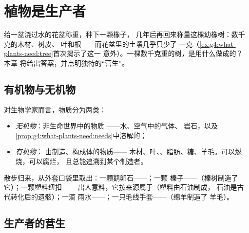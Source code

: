 \chapter{植物是生产者}\label{ch:g6:plants-are-producers}

给一盆浇过水的花盆称重，种下一颗橡子，
几年后再回来称量这棵幼橡树：数千克的木材、树皮、
叶和根——而花盆里的土壤几乎只少了
一克（\cref{ex:g4:what-plants-need:tree}首次揭示了这一
意外）。一棵数千克重的树，是用什么做成的？本章
将给出答案，并点明独特的“营生”。

\section{有机物与无机物}

\begin{definition}[无机物与有机物]\label{def:g6:plants-are-producers:matter}
对生物学家而言，物质分为两类：
\begin{itemize}
  \item \emph{无机物}：非生命世界中的物质
        ——水、空气中的气体、
        岩石，以及
        \cref{prop:g4:what-plants-need:needs}中溶解的；
  \item \emph{有机物}：
        由制造、构成体的物质——
        木材、叶、、脂肪、糖、羊毛。可以燃烧，可以腐烂，
        且总能追溯到某个制造者。
\end{itemize}
\end{definition}

\begin{example}[分拣一口袋的东西]\label{ex:g6:plants-are-producers:sorting}
散步归来，从外套口袋里取出：一颗鹅卵石——；一颗
榛子——（榛树制造了它）；一颗塑料纽扣——
出人意料，它按来源属于（塑料由石油制成，
石油是古代转化后的遗骸）；一滴
雨水——；一只毛线手套——（绵羊制造了
羊毛）。
\end{example}

\section{生产者的营生}

